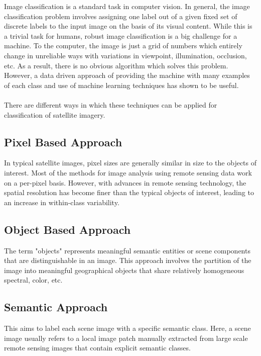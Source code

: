 \documentclass[12pt, a4paper]{report}
\begin{document}
Image classification is a standard task in computer vision. In general, the image classification problem involves assigning one  label out of a given fixed set of discrete labels to the input image on the basis of its visual content. While this is a trivial task for humans, robust image classification is a big challenge for a machine. To the computer, the image is just a grid of numbers which entirely change in unreliable ways with variations in viewpoint, illumination, occlusion, etc. As a result, there is no obvious algorithm which solves this problem. However, a data driven approach of providing the machine with many examples of each class and use of machine learning techniques has shown to be useful.\cite{cs231n}
\paragraph{}
There are different ways in which these techniques can be applied for classification of satellite imagery.
\subsection{Pixel Based Approach}
In typical satellite images, pixel sizes are generally similar in size to the objects of interest. Most of the methods for image analysis using remote sensing data work on a per-pixel basis. However, with advances in remote sensing technology, the spatial resolution has become finer than the typical objects of interest, leading to an increase in within-class variability.\cite{eyesky}
\subsection{Object Based Approach}
The term "objects" represents meaningful semantic entities or scene components that are distinguishable in an image.\cite{eyesky} This approach involves the partition of the image into meaningful geographical objects that share relatively homogeneous spectral, color, etc.
\subsection{Semantic Approach}
This aims to label each scene image with a specific semantic class. Here, a scene image usually refers to a local image patch manually extracted from large scale remote sensing images that contain explicit semantic classes.\cite{eyesky}
\end{document}
